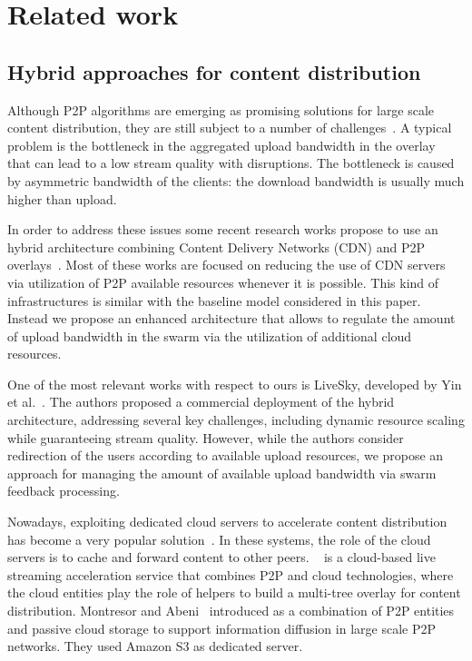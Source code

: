 {\section{Related work} \label{sec:relatedwork}

\subsection{Hybrid approaches for content distribution}
Although P2P algorithms are emerging as promising solutions for large scale
content distribution, they are still subject to a number of
challenges~\cite{challenge}. A typical problem is the bottleneck in the
aggregated upload bandwidth in the overlay~\cite{Kumar:MDT} that can lead to a
low stream quality with disruptions. The bottleneck is caused by asymmetric
bandwidth of the clients: the download bandwidth is usually much higher than
upload.

In order to address these issues some recent research works propose to use an
hybrid architecture combining Content Delivery Networks (CDN) and
P2P overlays~\cite{ZhiHui_Lu,eue,Roverso_smoothcache}. Most of these works are focused on
reducing the use of CDN servers via utilization of P2P available resources
whenever it is possible. This kind of infrastructures is similar with the baseline
model considered in this paper. Instead we propose an enhanced
architecture that allows to regulate the amount of upload bandwidth in the
swarm via the utilization of additional cloud resources.

One of the most relevant works with respect to ours is LiveSky, developed by Yin et
al.~\cite{liveSky}. The authors proposed a commercial deployment of the hybrid
architecture, addressing several key challenges,
including dynamic resource scaling while guaranteeing stream quality. However,
while the authors consider redirection of the users according to available
upload resources, we propose an approach for managing the amount of available
upload bandwidth via swarm feedback processing.


Nowadays, exploiting dedicated cloud servers to accelerate content distribution has become a very popular solution~\cite{CloudAngel,angelcast,budget}. 
In these systems, the role of the cloud servers is to cache and forward content to other peers. 
\angelcast~\cite{CloudAngel,angelcast} is a cloud-based live streaming acceleration service that combines P2P and cloud technologies, where the cloud entities play the role of helpers to build a multi-tree overlay for content distribution. Montresor and Abeni~\cite{cloudcast} introduced \cloudcast as a combination of P2P entities and passive cloud storage to support information diffusion in large scale P2P networks. They used Amazon S3 as dedicated server.

}
